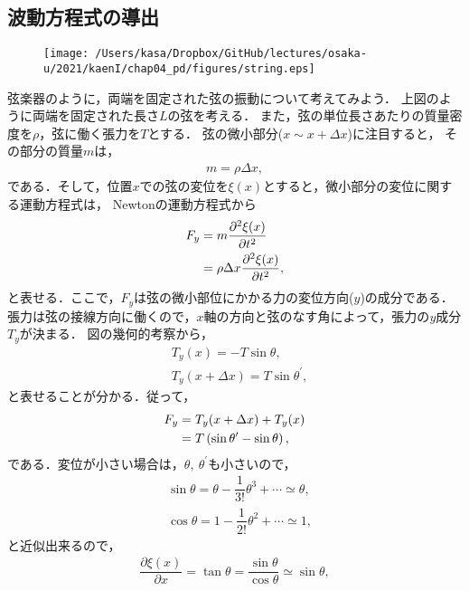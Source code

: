 \subsection{波動方程式の導出}
%
\begin{figure}[htbp]
  \centering
  \texttt{[image: /Users/kasa/Dropbox/GitHub/lectures/osaka-u/2021/kaenI/chap04\_pd/figures/string.eps]} 
\end{figure}
弦楽器のように，両端を固定された弦の振動について考えてみよう．
上図のように両端を固定された長さ$L$の弦を考える．
また，弦の単位長さあたりの質量密度を$\rho$，弦に働く張力を$T$とする．
弦の微小部分($x\sim x+\Delta x$)に注目すると，
その部分の質量$m$は，
\begin{align}
  m = \rho \Delta x, 
\end{align}
である．そして，位置$x$での弦の変位を$\xi(x)$とすると，微小部分の変位に関する運動方程式は，
Newtonの運動方程式から
\begin{align}
 F_{y} &= m\dfrac{\partial^{2}\xi(x)}{\partial t^2} \notag \\
       &= \rho \Delta x \dfrac{\partial^{2}\xi(x)}{\partial t^2}, \label{Newton_eq_string} 
\end{align}
と表せる．ここで，$F_{y}$は弦の微小部位にかかる力の変位方向($y$)の成分である．
張力は弦の接線方向に働くので，$x$軸の方向と弦のなす角によって，張力の$y$成分$T_{y}$が決まる．
図の幾何的考察から，
\begin{align}
  &T_{y}(x)    = -T \sin \theta, \\
  &T_{y}(x+\Delta x) =  T \sin \theta^{\prime},  
\end{align}
と表せることが分かる．従って，
\begin{align}
  F_{y} &= T_{y}(x+\Delta x)+ T_{y}(x)  \notag \\
        &= T\left(\sin\theta^{\prime}-\sin\theta\right), \label{force_string}
\end{align}
である．変位が小さい場合は，$\theta,~\theta^{\prime}$も小さいので，
\begin{align}
  &\sin\theta = \theta - \dfrac{1}{3!}\theta^{3} + \cdots \simeq \theta, \\
  &\cos\theta = 1 - \dfrac{1}{2!}\theta^2 + \cdots \simeq 1, 
\end{align}
と近似出来るので，
\begin{align}
  \dfrac{\partial \xi (x)}{\partial x} = \tan \theta  = \dfrac{\sin \theta}{\cos \theta} \simeq \sin \theta,
\end{align}
